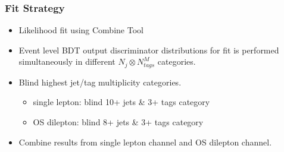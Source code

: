 \documentclass{beamer}
\begin{document}
\begin{frame}
\frametitle{Fit Strategy}
\begin{itemize}
	\item Likelihood fit using Combine Tool
	\vspace{10pt}
	\item Event level BDT output discriminator distributions for fit is performed simultaneously in different $N_{j} \otimes N_{tags}^{M}$ categories.
	\vspace{10pt}
	\item Blind highest jet/tag multiplicity categories. \begin{itemize}
		\item single lepton: blind 10+ jets \& 3+ tags category
		\item OS dilepton: blind 8+ jets \& 3+ tags category\end{itemize}
	\vspace{10pt}
	\item Combine results from single lepton channel and OS dilepton channel.
\end{itemize}
\end{frame}

\end{document}
